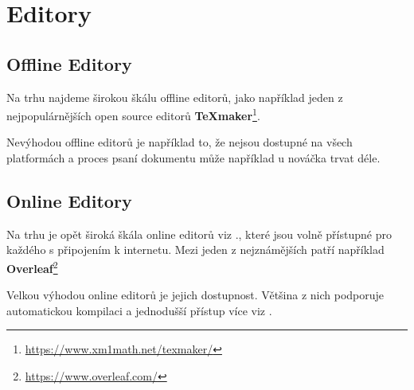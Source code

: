 \documentclass[a4paper,12pt]{article}
\begin{document}
\section{Editory}
\subsection{Offline Editory}
Na trhu najdeme širokou škálu offline editorů, jako například jeden z nejpopulárnějších open source editorů \textbf{TeXmaker}\footnote{\url{https://www.xm1math.net/texmaker/}}. \par
Nevýhodou offline editorů je například to, že nejsou dostupné na všech platformách a proces psaní dokumentu může například u nováčka trvat déle.

\subsection{Online Editory}
Na trhu je opět široká škála online editorů viz \cite{SokolThesis}., které jsou volně přístupné pro každého s připojením k internetu. Mezi jeden z nejznámějších patří například \textbf{Overleaf}\footnote{\url{https://www.overleaf.com/}} \par
Velkou výhodou online editorů je jejich dostupnost. Většina z nich podporuje automatickou kompilaci a jednodušší přístup více viz \cite{MashitaArticle}.

\newpage


\end{document}
